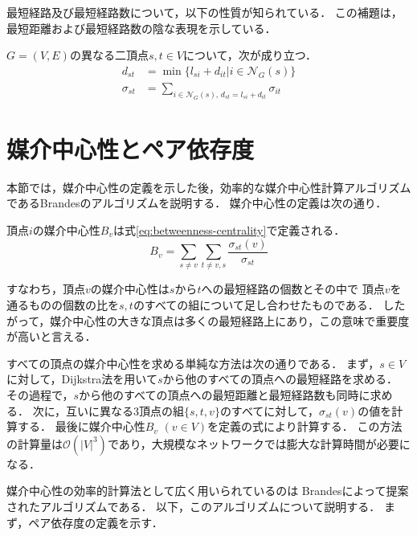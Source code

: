 最短経路及び最短経路数について，以下の性質が知られている．
この補題は，最短距離および最短経路数の陰な表現を示している．

\begin{lemma}
  \label{lemma:distance-and-geodesics}
  $G=(V,E)$の異なる二頂点$s,t\in V$について，次が成り立つ．
  \begin{equation*}
    \begin{aligned}
      d_{st}&=\min\{l_{si}+d_{it}|i\in\mathcal{N}_G(s)\} \\
      \sigma_{st}&=\sum_{i\in\mathcal{N}_G(s),\,d_{st}=l_{si}+d_{it}}\sigma_{it}
    \end{aligned}
  \end{equation*}
\end{lemma}

\section{媒介中心性とペア依存度}
\label{sect:pairwise-dependency}

本節では，媒介中心性の定義を示した後，効率的な媒介中心性計算アルゴリズムであるBrandesのアルゴリズムを説明する．
媒介中心性の定義は次の通り．

\begin{definition}
  \label{def:betweenness-centrality}
  頂点$i$の媒介中心性$B_v$は式\eqref{eq:betweenness-centrality}で定義される．
  \begin{equation}
    B_v=\sum_{s\neq v}\sum_{t\neq {v,s}}\frac{\sigma_{st}(v)}{\sigma_{st}}
    \label{eq:betweenness-centrality}
  \end{equation}
\end{definition}

すなわち，頂点$v$の媒介中心性は$s$から$t$への最短経路の個数とその中で
頂点$v$を通るものの個数の比を$s,t$のすべての組について足し合わせたものである．
したがって，媒介中心性の大きな頂点は多くの最短経路上にあり，この意味で重要度が高いと言える．

すべての頂点の媒介中心性を求める単純な方法は次の通りである．
まず，$s\in V$に対して，Dijkstra法を用いて$s$から他のすべての頂点への最短経路を求める．
その過程で，$s$から他のすべての頂点への最短距離と最短経路数も同時に求める．
次に，互いに異なる3頂点の組$\{s,t,v\}$のすべてに対して，$\sigma_{st}(v)$の値を計算する．
最後に媒介中心性$B_v$ $(v\in V)$を定義の式により計算する．
この方法の計算量は$\mathcal{O}(|V|^3)$であり，大規模なネットワークでは膨大な計算時間が必要になる．

媒介中心性の効率的計算法として広く用いられているのは
Brandes\cite{Brandes2001}によって提案されたアルゴリズムである．
以下，このアルゴリズムについて説明する．
まず，ペア依存度の定義を示す．

